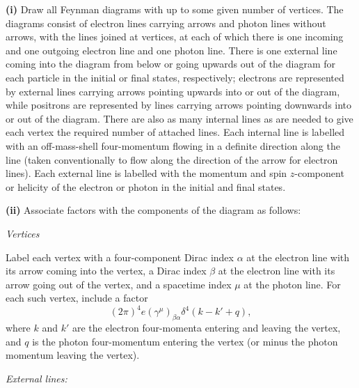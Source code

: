 \medskip
\noindent\textbf{(i)} Draw all Feynman diagrams with up to some given number
of vertices. The diagrams consist of electron lines carrying arrows and photon
lines without arrows, with the lines joined at vertices, at each of which there
is one incoming and one outgoing electron line and one photon line. There is
one external line coming into the diagram from below or going upwards out of
the diagram for each particle in the initial or final states, respectively;
electrons are represented by external lines carrying arrows pointing upwards
into or out of the diagram, while positrons are represented by lines carrying
arrows pointing downwards into or out of the diagram. There are also as many
internal lines as are needed to give each vertex the required number of
attached lines. Each internal line is labelled with an off-mass-shell
four-momentum flowing in a definite direction along the line (taken
conventionally to flow along the direction of the arrow for electron lines).
Each external line is labelled with the momentum and spin $z$-component or
helicity of the electron or photon in the initial and final states.

\medskip
\noindent\textbf{(ii)} Associate factors with the components of the diagram
as follows:

\begin{center}
\textit{Vertices}
\end{center}

Label each vertex with a four-component Dirac index $\alpha$ at the electron
line with its arrow coming into the vertex, a Dirac index $\beta$ at the
electron line with its arrow going out of the vertex, and a spacetime index
$\mu$ at the photon line. For each such vertex, include a factor
\begin{equation}
(2\pi)^4e(\gamma^\mu)_{\beta\alpha}
\delta^4(k-k'+q),
\tag{8.6.4}\label{eq:8.6.4}
\end{equation}
where $k$ and $k'$ are the electron four-momenta entering and leaving the
vertex, and $q$ is the photon four-momentum entering the vertex (or minus the
photon momentum leaving the vertex).

\begin{center}
\textit{External lines:}
\end{center}

